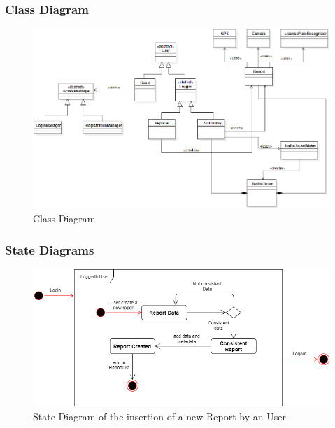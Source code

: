 \subsubsection{Class Diagram}
    \begin{figure}[h]
        \centering
        \includegraphics[scale=0.5]{Images/ClassDiag.png}
        \caption{Class Diagram}
    \end{figure}

\newpage

\subsubsection{State Diagrams}
    \begin{figure}[h]
        \centering
        \includegraphics[scale=0.5]{Images/StateDiag_addReport.png}
        \caption{State Diagram of the insertion of a new Report by an User}
    \end{figure}
    
    \vspace{30px}
    
